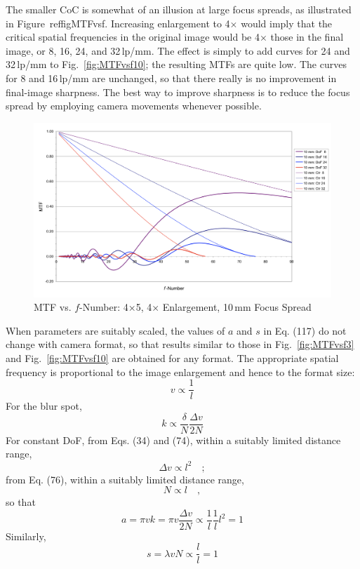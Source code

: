 \documentclass[11pt, oneside]{scrartcl}   	%
\newcommand{\Dv}{\ensuremath{\Delta v}}
\begin{document}
The smaller CoC is somewhat of an illusion at large focus spreads, as illustrated in Figure~ref{figMTFvsf}. Increasing enlargement to 4$\times$ would imply that the critical spatial frequencies in the original image would be 4$\times$ those in the final image, or 8, 16, 24, and 32\,lp/mm. The effect is simply to add curves for 24 and 32\,lp/mm to Fig.~\ref{fig:MTFvsf10}; the resulting MTFs are quite low. The curves for 8 and 16\,lp/mm are unchanged, so that there really is no improvement in final-image sharpness. The best way to improve sharpness is to reduce the focus spread by employing camera movements whenever possible.
\begin{figure}[htbp] %
   \centering
   \includegraphics[width=\linewidth]{figure/fig_dofd_15} 
   \caption{MTF vs. $f$-Number: 4×5, 4× Enlargement, 10\,mm Focus Spread}
   \label{fig:MTFvsf2}
\end{figure}

When parameters are suitably scaled, the values of $a$ and $s$ in Eq. (117) do not change with camera format, so that results similar to those in Fig.~\ref{fig:MTFvsf3} and Fig.~\ref{fig:MTFvsf10} are obtained for any format. The appropriate spatial frequency is proportional to the image enlargement and hence to the format size:
\begin{equation}
   v \propto \frac1l
\end{equation}
For the blur spot,
\begin{equation}
k \propto \frac \delta N  \frac{Δv}{2N}
\end{equation}
For constant DoF, from Eqs. (34) and (74), within a suitably limited distance range, 
\begin{equation}
Δv \propto l^2 \quad ;
\end{equation}
from Eq. (76), within a suitably limited distance range, 
\begin{equation}
N\propto l\quad,
\end{equation}
so that
\begin{equation}
a = \pi v k = \pi v\frac{\Dv}{2N} \propto \frac{1}{l}\frac1l l^2 = 1
\end{equation}
Similarly,
\begin{equation}
s=\lambda v N\propto \frac{l}{l}=1
\end{equation}
\end{document}
